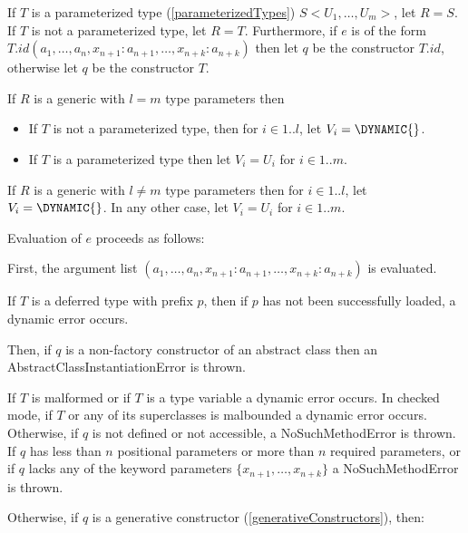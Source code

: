 \documentclass{article}
\newcommand{\code}[1]{{\sf #1}}
\begin{document}
\LMHash{}
If $T$ is a parameterized type (\ref{parameterizedTypes}) $S<U_1,  \ldots, U_m>$, let $R = S$.  
If $T$ is not a parameterized type, let $R = T$.
Furthermore, if $e$ is of the form \NEW{} $T.id(a_1, \ldots , a_n, x_{n+1}: a_{n+1}, \ldots , x_{n+k}: a_{n+k})$ then let  $q$ be the constructor  $T.id$, otherwise let $q$ be the constructor $T$. 

\LMHash{}
If $R$ is a generic with $l = m$ type parameters then
\begin{itemize}
\item  If $T$ is not a parameterized type, then for $ i \in 1 .. l$, let $V_i =  \DYNAMIC{}$.
\item  If $T$ is  a parameterized type then let $V_i = U_i$ for $ i \in 1 .. m$.  
\end{itemize}

\LMHash{}
If $R$ is a generic with $l \ne m$ type parameters then for $ i \in 1 .. l$, let $V_i =  \DYNAMIC{}$. In any other case, let $V_i = U_i$ for $ i \in 1 .. m$.  

\LMHash{}
Evaluation of $e$ proceeds as follows:

\LMHash{}
First, the argument list $(a_1, \ldots , a_n, x_{n+1}: a_{n+1}, \ldots , x_{n+k}: a_{n+k})$ is evaluated. 

\LMHash{}
If $T$ is a deferred type with prefix $p$, then if $p$ has not been successfully loaded, a dynamic error occurs.

\LMHash{}
Then, if $q$ is a non-factory constructor of an abstract class then an \code{AbstractClassInstantiationError} is thrown.

\LMHash{}
If $T$  is malformed or if $T$ is a type variable a dynamic error occurs. In checked mode, if $T$ or any of its superclasses is malbounded a dynamic error occurs.
 Otherwise, if $q$ is not defined or not accessible, a \code{NoSuchMethodError} is thrown.  If $q$ has  less than $n$ positional parameters or more than $n$ required parameters, or if $q$ lacks any of the keyword parameters $\{ x_{n+1}, \ldots, x_{n+k}\}$ a \code{NoSuchMethodError} is thrown.

\LMHash{}
Otherwise, if $q$ is a generative constructor (\ref{generativeConstructors}), then:

\end{document}
